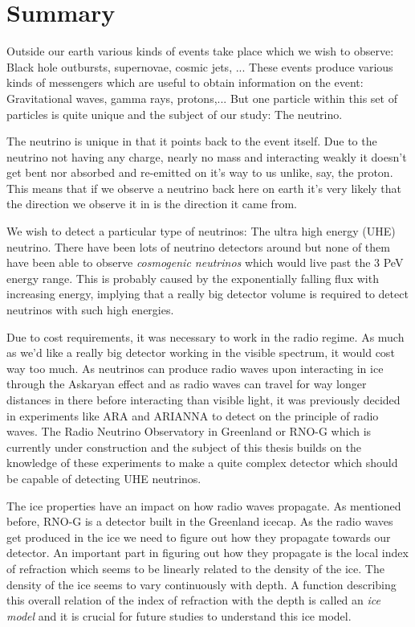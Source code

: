 \shipout\null
\newpage
\chapter*{Summary}
Outside our earth various kinds of events take place which we wish to 
observe: Black hole outbursts, supernovae, cosmic jets, ...
These events produce various kinds of messengers which are useful to obtain
information on the event: Gravitational waves, gamma rays, protons,...
But one particle within this set of particles is quite unique and
the subject of our study: The neutrino. 

The neutrino is unique in that it points back to the event itself.
Due to the neutrino not having any charge, nearly no mass and 
interacting weakly it doesn't get bent nor absorbed and re-emitted 
on it's way to us unlike, say, the proton. This means that if we observe
a neutrino back here on earth it's very likely that the direction we observe
it in is the direction it came from.

We wish to detect a particular type of neutrinos: The ultra high energy (UHE)
neutrino.  There have been lots of neutrino detectors around but none of them
have been able to observe \textit{cosmogenic neutrinos} which would live past
the 3 PeV energy range. This is probably caused by the exponentially falling
flux with increasing energy, implying that a really big detector volume is
required to detect neutrinos with such high energies. 

Due to cost requirements, it was necessary to work in the radio regime.  As
much as we'd like a really big detector working in the visible spectrum, it
would cost way too much. As neutrinos can produce radio waves upon interacting
in ice through the Askaryan effect and as radio waves can travel for way longer
distances in there before interacting than visible light, it was previously
decided in experiments like ARA and ARIANNA to detect on the principle of
radio waves. The Radio Neutrino Observatory in Greenland or RNO-G which is
currently under construction and the subject of this thesis builds on the
knowledge of these experiments to make a quite complex detector which
should be capable of detecting UHE neutrinos.

The ice properties have an impact on how radio waves propagate. As mentioned before, RNO-G is a detector built
in the Greenland icecap. As the radio waves get produced in the ice we need to figure out how
they propagate towards our detector. An important part in figuring out how they propagate is 
the local index of refraction which seems to be linearly related to the density of the ice. 
The density of the ice seems to vary continuously with depth. A function describing
this overall relation of the index of refraction with the depth is called an \textit{ice model}
and it is crucial for future studies to understand this ice model.

